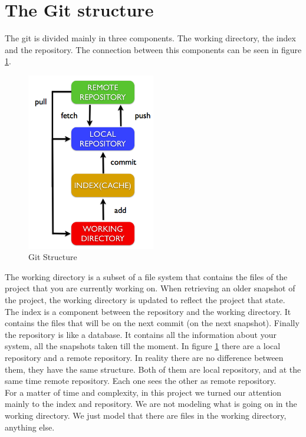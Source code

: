 \section{The Git structure}
The git is divided mainly in three components. The working directory,
the index and the repository. The connection between this components
can be seen in figure \ref{fig:git_structure}. 

\begin{figure}[h!]
   \centering
   \includegraphics[width=0.5\textwidth]{images/data_flow_simplified.png}
   \caption{Git Structure}\label{fig:git_structure}
\end{figure}

The working directory is a subset of
a file system that contains the files of the project that you are
currently working on. When retrieving an older snapshot of the project, the
working directory is updated to reflect the project that state. The index is a
component between the repository and the working directory. It
contains the files that will be on the next commit
(on the next snapshot). Finally the repository is like a database. It contains 
all the information about your system, all the snapshots taken till
the moment. In figure \ref{fig:git_structure} there are a local
repository and a remote repository. In reality there are no difference
between them, they have the same structure. Both of them are local
repository, and at the same time remote repository. Each one sees the 
other as remote repository.\\

For a matter of time and complexity, in this project we turned our attention 
mainly to the index and repository. We are not modeling what is going
on in the working directory. We just model that there are files in the
working directory, anything else.
